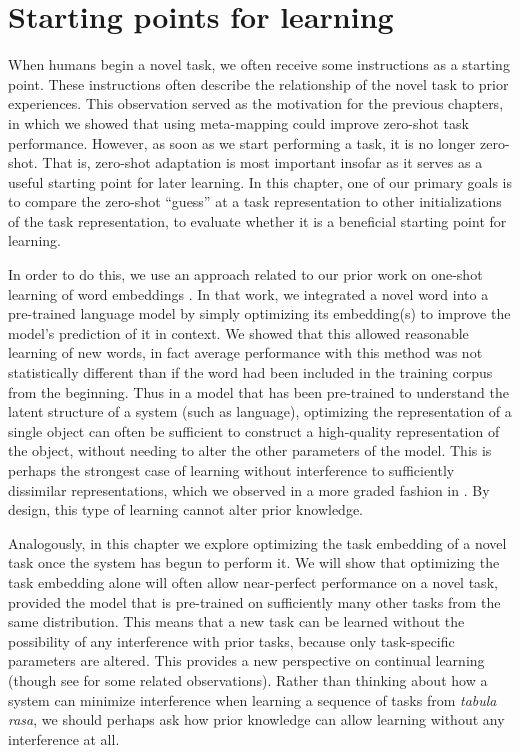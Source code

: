 \section{Starting points for learning}

When humans begin a novel task, we often receive some instructions as a starting point. These instructions often describe the relationship of the novel task to prior experiences. This observation served as the motivation for the previous chapters, in which we showed that using meta-mapping could improve zero-shot task performance. However, as soon as we start performing a task, it is no longer zero-shot. That is, zero-shot adaptation is most important insofar as it serves as a useful starting point for later learning. In this chapter, one of our primary goals is to compare the zero-shot ``guess'' at a task representation to other initializations of the task representation, to evaluate whether it is a beneficial starting point for learning. \par 
In order to do this, we use an approach related to our prior work on one-shot learning of word embeddings \citep{Lampinen2018a}. In that work, we integrated a novel word into a pre-trained language model by simply optimizing its embedding(s) to improve the model's prediction of it in context. We showed that this allowed reasonable learning of new words, in fact average performance with this method was not statistically different than if the word had been included in the training corpus from the beginning. Thus in a model that has been pre-trained to understand the latent structure of a system (such as language), optimizing the representation of a single object can often be sufficient to construct a high-quality representation of the object, without needing to alter the other parameters of the model. This is perhaps the strongest case of learning without interference to sufficiently dissimilar representations, which we observed in a more graded fashion in \citet{McClelland2020}. By design, this type of learning cannot alter prior knowledge.\par
Analogously, in this chapter we explore optimizing the task embedding of a novel task once the system has begun to perform it. We will show that optimizing the task embedding alone will often allow near-perfect performance on a novel task, provided the model that is pre-trained on sufficiently many other tasks from the same distribution. This means that a new task can be learned without the possibility of any interference with prior tasks, because only task-specific parameters are altered. This provides a new perspective on continual learning (though see \citep{Oswald2020} for some related observations). Rather than thinking about how a system can minimize interference when learning a sequence of tasks from \emph{tabula rasa}, we should perhaps ask how prior knowledge can allow learning without any interference at all. \par 
